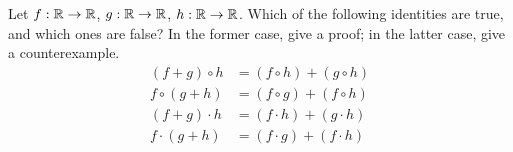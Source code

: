 \exercisesection

\begin{ex}\label{i:ex:9.2.1}
  Let \(f : \mathbb{R} \to \mathbb{R}\), \(g : \mathbb{R} \to \mathbb{R}\), \(h : \mathbb{R} \to \mathbb{R}\).
  Which of the following identities are true, and which ones are false?
  In the former case, give a proof;
  in the latter case, give a counterexample.
  \begin{align*}
    (f + g) \circ h & = (f \circ h) + (g \circ h) \\
    f \circ (g + h) & = (f \circ g) + (f \circ h) \\
    (f + g) \cdot h & = (f \cdot h) + (g \cdot h) \\
    f \cdot (g + h) & = (f \cdot g) + (f \cdot h)
  \end{align*}
\end{ex}

